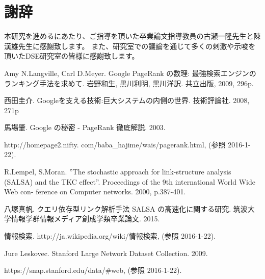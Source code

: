 \documentclass[a4paper,11pt]{jreport}
\begin{document}
\chapter*{謝辞}

本研究を進めるにあたり、ご指導を頂いた卒業論文指導教員の古瀬一隆先生と陳漢雄先生に感謝致します。
また、研究室での議論を通じて多くの刺激や示唆を頂いたDSE研究室の皆様に感謝致します。

\newpage


\renewcommand{\bibname}{参考文献}

%
%

\begin{thebibliography}{1}
Amy N.Langville, Carl D.Meyer. Google PageRank の数理: 最強検索エンジンの ランキング手法を求めて. 岩野和生, 黒川利明, 黒川洋訳. 共立出版, 2009, 296p.

西田圭介. Googleを支える技術:巨大システムの内側の世界. 技術評論社. 2008, 271p

馬場肇. Google の秘密 - PageRank 徹底解説. 2003. 

http://homepage2.nifty. com/baba\_hajime/wais/pagerank.html, (参照 2016-1-22).

R.Lempel, S.Moran. ”The stochastic approach for link-structure analysis (SALSA) and the TKC effect”. Proceedings of the 9th international World Wide Web con- ference on Computer networks. 2000, p.387-401.

八塚真帆. クエリ依存型リンク解析手法 SALSA の高速化に関する研究. 筑波大学情報学群情報メディア創成学類卒業論文. 2015.

情報検索. http://ja.wikipedia.org/wiki/情報検索, (参照 2016-1-22).

Jure Leskovec. Stanford Large Network Dataset Collection. 2009.

https://snap.stanford.edu/data/\#web, (参照 2016-1-22).

\end{thebibliography}
\end{document}
